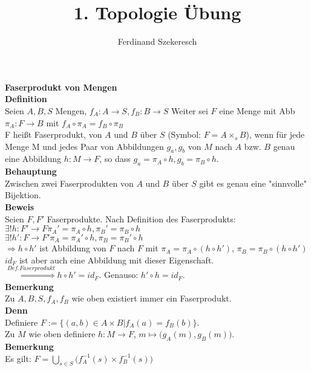 \documentclass{article}
\title{1. Topologie Übung}
\author{Ferdinand Szekeresch}
\begin{document}
\maketitle

\textbf{Faserprodukt von Mengen}\\
\textbf{Definition}\\
Seien $A,B,S$ Mengen, $f_A : A \rightarrow S, f_B: B \rightarrow S$ Weiter sei $F$ eine Menge mit Abb $\pi_A : F \rightarrow B$ mit $f_A \circ \pi_A = f_B \circ \pi_B$ \\
F heißt Faserprodukt, von $A$ und $B$ über $S$ (Symbol: $F = A\times_sB$), wenn für jede Menge M und jedes Paar von Abbildungen $g_a,g_b$ von $M$ nach $A$ bzw. $B$ genau eine Abbildung $h: M \rightarrow F$, so dass $g_a = \pi_A \circ h, g_b = \pi_B \circ h$. \\
\textbf{Behauptung}\\
Zwischen zwei Faserprodukten von $A$ und $B$ über $S$ gibt es genau eine "sinnvolle" Bijektion.\\
\textbf{Beweis}\\
Seien $F,F'$ Faserprodukte. Nach Definition des Faserprodukts:\\
$\exists ! h: F' \rightarrow F \pi_A' = \pi_A\circ h, \pi_B' = \pi_B\circ h$\\
$\exists ! h': F \rightarrow F' \pi_A = \pi_A'\circ h, \pi_B = \pi_B'\circ h$\\
$\Rightarrow h\circ h'$ ist Abbildung von $F$ nach $F$ mit $\pi_A = \pi_A\circ (h\circ h')$, $\pi_B = \pi_B\circ (h\circ h')$
$id_F$ ist aber auch eine Abbildung mit dieser Eigenschaft.\\
$\stackrel{Def. Faserprodukt}{\Rightarrow} h \circ h' = id_F$. Genauso: $h' \circ h = id_F$.\\
\textbf{Bemerkung}\\
Zu $A,B,S,f_A,f_B$ wie oben existiert immer ein Faserprodukt.\\
\textbf{Denn}\\
Definiere $F:=\{(a,b)\in A\times B | f_A(a) = f_B(b)\}$.\\
Zu $M$ wie oben definiere $h:M\rightarrow F$, $m \mapsto\big(g_A(m),g_B(m)\big)$.\\
\textbf{Bemerkung}\\
Es gilt: $F = \bigcup\limits_{s\in S}\big(f_A^{-1}(s)\times f_B^{-1}(s)\big)$
\end{document}
